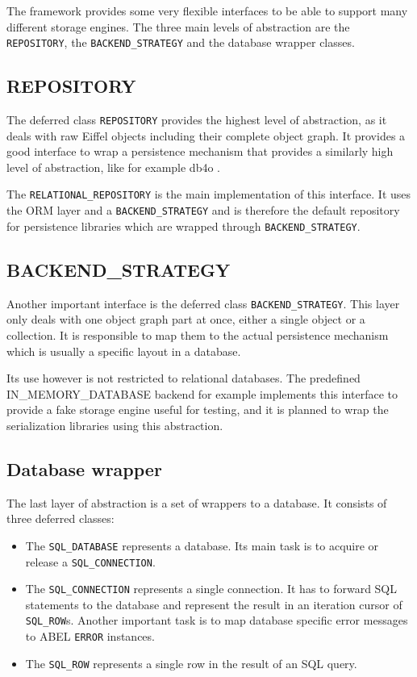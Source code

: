 The framework provides some very flexible interfaces to be able to support many different storage engines. 
The three main levels of abstraction are the \lstinline!REPOSITORY!, the \lstinline!BACKEND_STRATEGY! and the database wrapper classes.

\subsection{REPOSITORY}

The deferred class \lstinline!REPOSITORY! provides the highest level of abstraction, as it deals with raw Eiffel objects including their complete object graph.
It provides a good interface to wrap a persistence mechanism that provides a similarly high level of abstraction, like for example db4o \cite{db4o}.

The \lstinline!RELATIONAL_REPOSITORY! is the main implementation of this interface.
It uses the ORM layer and a \lstinline!BACKEND_STRATEGY! and is therefore the default repository for persistence libraries which are wrapped through \lstinline!BACKEND_STRATEGY!.

\subsection{BACKEND\_STRATEGY}

Another important interface is the deferred class \lstinline!BACKEND_STRATEGY!.
This layer only deals with one object graph part at once, either a single object or a collection.
It is responsible to map them to the actual persistence mechanism which is usually a specific layout in a database.

Its use however is not restricted to relational databases.
The predefined IN\_MEMORY\_DATABASE backend for example implements this interface to provide a fake storage engine useful for testing, and it is planned to wrap the serialization libraries using this abstraction.

\subsection{Database wrapper}


The last layer of abstraction is a set of wrappers to a database. 
It consists of three deferred classes: 
\begin{itemize}
 \item The \lstinline!SQL_DATABASE! represents a database. Its main task is to acquire or release a \lstinline!SQL_CONNECTION!.
 \item The \lstinline!SQL_CONNECTION! represents a single connection. 
It has to forward SQL statements to the database and represent the result in an iteration cursor of \lstinline!SQL_ROW!s.
Another important task is to map database specific error messages to ABEL \lstinline!ERROR! instances.
  \item The \lstinline!SQL_ROW! represents a single row in the result of an SQL query.
\end{itemize}

